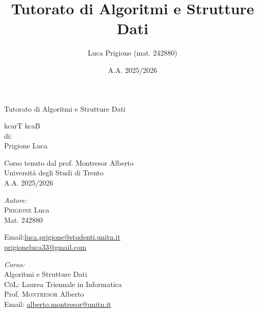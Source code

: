 \documentclass[a4paper,twoside]{report}
\title{Tutorato di Algoritmi e Strutture Dati}
\author{Luca Prigione (mat. 242880)}
\date{A.A. 2025/2026}
\begin{document}
    

    \begin{titlepage}
        \centering  %
        
        {\Huge\textbf\hfill{Tutorato di Algoritmi e Strutture Dati}\hfill} %
        \vspace{1.5cm}

        {\Large kcarT kcaB} \\[1cm] %

        
        {\normalsize di: } \\[.3cm]
        {\Large Prigione Luca} \\ %
        \vspace{1.5cm}
        

        {\normalsize Corso tenuto dal prof. Montresor Alberto} \\[0.3cm] %
        {\large Università degli Studi di Trento} \\[1.5cm]
        
        {\large A.A. 2025/2026} \\[3cm] %
        
        \vfill
        \begin{minipage}[t]{0.4\textwidth}
            \begin{flushleft} \normalsize
                \emph{Autore:}\\
                \textsc{Prigione} Luca \\ %
                Mat. 242880 \\
                \vspace{-\baselineskip}
                \begin{tabbing}
                    Email:\= \href{mailto:luca.prigione@studenti.unitn.it}{luca.prigione@studenti.unitn.it} \\
                        \>  \href{mailto:prigioneluca33@gmail.com}{prigioneluca33@gmail.com}
                \end{tabbing}
            \end{flushleft}
        \end{minipage}%
        \hfill
        \begin{minipage}[t]{0.4\textwidth}
            \begin{flushleft} \normalsize
                \emph{Corso:}\\
                Algoritmi e Strutture Dati \\
                \textsc{CdL}: Laurea Triennale in Informatica \\
                Prof. \textsc{Montresor} Alberto \\
                Email: \href{mailto:alberto.montresor@unitn.it}{alberto.montresor@unitn.it}
            \end{flushleft}
        \end{minipage}
        \vfill
    \end{titlepage}
    
    
\end{document}

